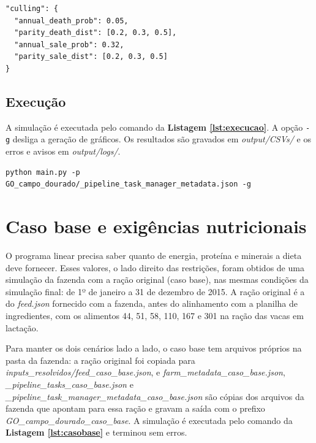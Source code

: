 \documentclass[a4paper,12pt]{article}
\begin{document}
\begin{lstlisting}[caption={Bloco de descarte adotado no \textit{animal.json}.}, label={lst:culling}]
"culling": {
  "annual_death_prob": 0.05,
  "parity_death_dist": [0.2, 0.3, 0.5],
  "annual_sale_prob": 0.32,
  "parity_sale_dist": [0.2, 0.3, 0.5]
}
\end{lstlisting}

\subsection{Execução}

A simulação é executada pelo comando da \textbf{Listagem \ref{lst:execucao}}. A opção \texttt{-g} desliga a geração de gráficos. Os resultados são gravados em \textit{output/CSVs/} e os erros e avisos em \textit{output/logs/}.

\begin{lstlisting}[caption={Execução da simulação.}, label={lst:execucao}]
python main.py -p GO_campo_dourado/_pipeline_task_manager_metadata.json -g
\end{lstlisting}

\section{Caso base e exigências nutricionais}\label{sec:exigencias}

O programa linear precisa saber quanto de energia, proteína e minerais a dieta deve fornecer. Esses valores, o lado direito das restrições, foram obtidos de uma simulação da fazenda com a ração original (caso base), nas mesmas condições da simulação final: de 1º de janeiro a 31 de dezembro de 2015. A ração original é a do \textit{feed.json} fornecido com a fazenda, antes do alinhamento com a planilha de ingredientes, com os alimentos 44, 51, 58, 110, 167 e 301 na ração das vacas em lactação.

Para manter os dois cenários lado a lado, o caso base tem arquivos próprios na pasta da fazenda: a ração original foi copiada para \textit{inputs\_\allowbreak resolvidos/\allowbreak feed\_\allowbreak caso\_\allowbreak base.json}, e \textit{farm\_\allowbreak metadata\_\allowbreak caso\_\allowbreak base.json}, \textit{\_pipeline\_\allowbreak tasks\_\allowbreak caso\_\allowbreak base.json} e \textit{\_pipeline\_\allowbreak task\_\allowbreak manager\_\allowbreak metadata\_\allowbreak caso\_\allowbreak base.json} são cópias dos arquivos da fazenda que apontam para essa ração e gravam a saída com o prefixo \textit{GO\_\allowbreak campo\_\allowbreak dourado\_\allowbreak caso\_\allowbreak base}. A simulação é executada pelo comando da \textbf{Listagem \ref{lst:casobase}} e terminou sem erros.
\end{document}
